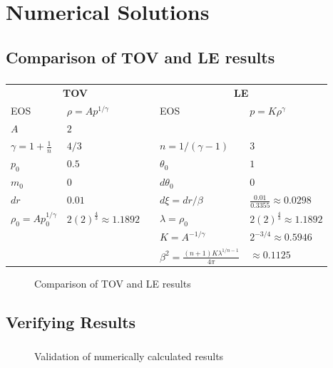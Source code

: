 \section{Numerical Solutions}

\subsection{Comparison of TOV and LE results}

\begin{frame}
	\frametitle{\insertsubsection}
	\begin{table}[H]
		\renewcommand{\arraystretch}{1.2}
		\centering
		\begin{tabular}{@{}llcll@{}}
			\toprule
			\multicolumn{2}{c}{\textbf{TOV}} & \phantom{b} &\multicolumn{2}{c}{\textbf{LE}}\\
			\cmidrule{1-2} \cmidrule{4-5}
			EOS & $\rho=Ap^{1/\gamma}$ && EOS & $p=K\rho^{\gamma}$\\
			$A$ & $2$ & & \\
			$\gamma=1+\frac{1}{n}$ & $4/3$ && $n=1/(\gamma-1)$ & $3$\\
			$p_0$ & $0.5$ && $\theta_0$ & $1$\\
			$m_0$ & $0$ && $d\theta_0$ & $0$\\
			$dr$ & $0.01$ && $d\xi=dr/\beta$ & $\frac{0.01}{0.3355}\approx0.0298$\\
			\cmidrule{1-2} \cmidrule{4-5}
			$\rho_0=Ap_0^{1/\gamma}$ & $2(2)^{\frac{4}{3}}\approx1.1892$ && $\lambda=\rho_0$ & $2(2)^{\frac{4}{3}}\approx1.1892$\\
			&&& $K=A^{-1/\gamma}$ & $2^{-3/4}\approx0.5946$\\
			&&& $\beta^2=\frac{(n+1)K\lambda^{1/n-1}}{4\pi}$ & $\approx0.1125$\\
			\bottomrule
		\end{tabular}
	\end{table}%
\end{frame}



\begin{frame}
	\begin{figure}
		\centering
		\caption{Comparison of TOV and LE results}
	\end{figure}
\end{frame}

\subsection{Verifying Results}
\begin{frame}
	\frametitle{\insertsubsection}
	\begin{figure}
		\centering
		\caption{Validation of numerically calculated results}
	\end{figure}
\end{frame}

